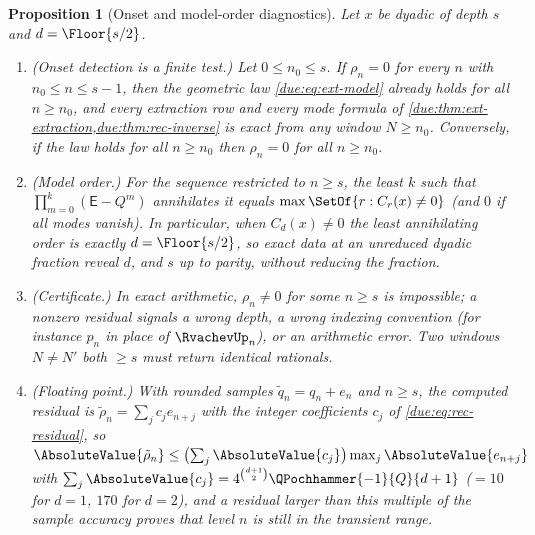 \documentclass[11pt,oneside]{article}
\theoremstyle{plain}
\newtheorem{proposition}[theorem]{Proposition}
\theoremstyle{definition}
\theoremstyle{remark}
\newcommand{\upn}[1]{\RvachevUp_{#1}}
\newcommand{\Qq}{Q}                                         %
\newcommand{\Cr}[2]{C_{#1}\!\left(#2\right)}                %
\newcommand{\qn}[1]{q_{#1}}                                 %
\begin{document}
\begin{proposition}[Onset and model-order diagnostics]
\label{due:prop:rec-diagnostics}
Let $x$ be dyadic of depth $s$ and $d=\Floor{s/2}$.
\begin{enumerate}
\item\label{due:it:diag-onset}
 (Onset detection is a finite test.)  Let $0\le n_{0}\le s$.  If
 $\rho_{n}=0$ for every $n$ with $n_{0}\le n\le s-1$, then the geometric law
 \cref{due:eq:ext-model} already holds for all $n\ge n_{0}$, and every
 extraction row and every mode formula of
 \cref{due:thm:ext-extraction,due:thm:rec-inverse} is exact from any window
 $N\ge n_{0}$.  Conversely, if the law holds for all $n\ge n_{0}$ then
 $\rho_{n}=0$ for all $n\ge n_{0}$.
\item\label{due:it:diag-order}
 (Model order.)  For the sequence restricted to $n\ge s$, the least $k$ such
 that $\prod_{m=0}^{k}(\mathsf E-\Qq^{m})$ annihilates it equals
 $\max\SetOf{r:\Cr{r}{x}\ne0}$ (and $0$ if all modes vanish).  In particular,
 when $\Cr{d}{x}\ne0$ the least annihilating order is exactly
 $d=\Floor{s/2}$, so exact data at an \emph{unreduced} dyadic fraction reveal
 $d$, and $s$ up to parity, without reducing the fraction.
\item\label{due:it:diag-exact}
 (Certificate.)  In exact arithmetic, $\rho_{n}\ne0$ for some $n\ge s$ is
 impossible; a nonzero residual signals a wrong depth, a wrong indexing
 convention (for instance $p_{n}$ in place of $\upn{n}$), or an arithmetic
 error.  Two windows $N\neq N'$ both $\ge s$ must return identical
 rationals.
\item\label{due:it:diag-float}
 (Floating point.)  With rounded samples $\tilde q_{n}=\qn{n}+e_{n}$ and
 $n\ge s$, the computed residual is
 $\tilde\rho_{n}=\sum_{j}c_{j}e_{n+j}$ with the integer coefficients $c_{j}$
 of \cref{due:eq:rec-residual}, so
 $\AbsoluteValue{\tilde\rho_{n}}\le\bigl(\sum_{j}\AbsoluteValue{c_{j}}\bigr)\max_{j}\AbsoluteValue{e_{n+j}}$
 with $\sum_{j}\AbsoluteValue{c_{j}}=4^{\binom{d+1}{2}}\QPochhammer{-1}{\Qq}{d+1}$
 ($=10$ for $d=1$, $170$ for $d=2$), and a residual larger than this
 multiple of the sample accuracy proves that level $n$ is still in the
 transient range.
\end{enumerate}
\end{proposition}
\end{document}
